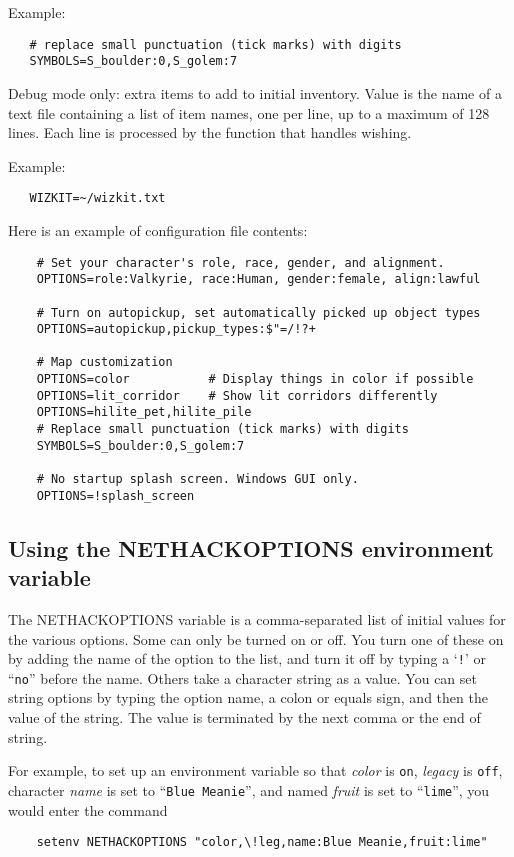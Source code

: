 Example:
\begin{verbatim}
   # replace small punctuation (tick marks) with digits
   SYMBOLS=S_boulder:0,S_golem:7
\end{verbatim}

\item[\bb{WIZKIT}]
Debug mode only:  extra items to add to initial inventory.
Value is the name of a text file containing a list of item names,
one per line, up to a maximum of 128 lines.
Each line is processed by the function that handles wishing.

Example:
\begin{verbatim}
   WIZKIT=~/wizkit.txt
\end{verbatim}
\elist

Here is an example of configuration file contents:
\begin{verbatim}
    # Set your character's role, race, gender, and alignment.
    OPTIONS=role:Valkyrie, race:Human, gender:female, align:lawful

    # Turn on autopickup, set automatically picked up object types
    OPTIONS=autopickup,pickup_types:$"=/!?+

    # Map customization
    OPTIONS=color           # Display things in color if possible
    OPTIONS=lit_corridor    # Show lit corridors differently
    OPTIONS=hilite_pet,hilite_pile
    # Replace small punctuation (tick marks) with digits
    SYMBOLS=S_boulder:0,S_golem:7

    # No startup splash screen. Windows GUI only.
    OPTIONS=!splash_screen
\end{verbatim}

\subsection*{Using the NETHACKOPTIONS environment variable}

The NETHACKOPTIONS variable is a comma-separated list of initial
values for the various options.  Some can only be turned on or off.
You turn one of these on by adding the name of the option to the list,
and turn it off by typing a `{\tt !}' or ``{\tt no}'' before the name.
Others take a
character string as a value.  You can set string options by typing
the option name, a colon or equals sign, and then the value of the string.
The value is terminated by the next comma or the end of string.

For example, to set up an environment variable so that
{\it color\/} is {\tt on},
{\it legacy\/} is {\tt off},
character {\it name\/} is set to ``{\tt Blue Meanie}'',
and named {\it fruit\/} is set to ``{\tt lime}'',
you would enter the command
\begin{verbatim}
    setenv NETHACKOPTIONS "color,\!leg,name:Blue Meanie,fruit:lime"
\end{verbatim}

